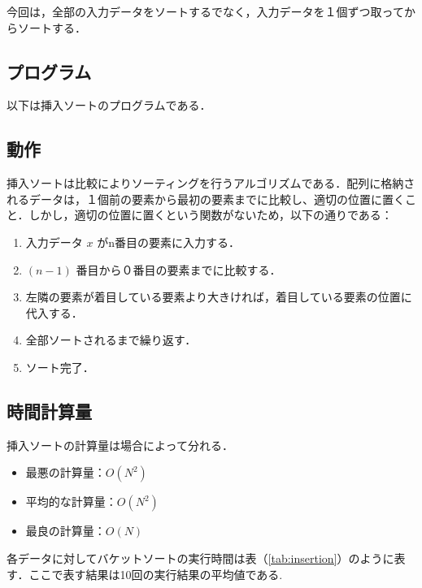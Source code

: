 \documentclass[a4j, titlepage]{jarticle}
\begin{document}
        今回は，全部の入力データをソートするでなく，入力データを１個ずつ取ってからソートする．
    
        \subsection{プログラム}
            以下は挿入ソートのプログラムである．
            

        \subsection{動作}
            挿入ソートは比較によりソーティングを行うアルゴリズムである．配列に格納されるデータは，１個前の要素から最初の要素までに比較し、適切の位置に置くこと．しかし，適切の位置に置くという関数がないため，以下の通りである：
            
            \begin{screen}
                \begin{enumerate}
                    \item 入力データ $x$ がn番目の要素に入力する．
                    \item $(n-1)$ 番目から０番目の要素までに比較する．
                    \item 左隣の要素が着目している要素より大きければ，着目している要素の位置に代入する．
                    \item 全部ソートされるまで繰り返す．
                    \item ソート完了．
                \end{enumerate}
            \end{screen}
            
        
        \subsection{時間計算量}
            挿入ソートの計算量は場合によって分れる．
            \begin{itemize}
                \item 最悪の計算量：$O(N^2)$
                \item 平均的な計算量：$O(N^2)$
                \item 最良の計算量：$O(N)$
            \end{itemize}

            各データに対してバケットソートの実行時間は表（\ref{tab:insertion}）のように表す．ここで表す結果は10回の実行結果の平均値である.
\end{document}
